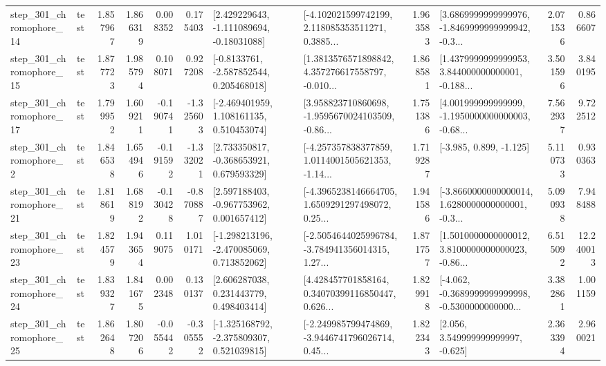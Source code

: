 \begin{tabular}{llrrrrllrlrr}
  step\_301\_chromophore\_14 &      test &      1.857967 &    1.866319 &      0.008352 &  0.175403 &    [2.429229643, -1.111089694, -0.18031088] &  [-4.102021599742199, 2.118085353511271, 0.3885... &       1.963583 &  [3.6869999999999976, -1.8469999999999942, -0.3... &            2.071536 &          0.866607 \\
  step\_301\_chromophore\_15 &      test &      1.877723 &    1.985794 &      0.108071 &  0.927208 &     [-0.8133761, -2.587852544, 0.205468018] &  [1.3813576571898842, 4.357276617558797, -0.010... &       1.868581 &  [1.4379999999999953, 3.844000000000001, -0.188... &            3.501596 &          3.840195 \\
  step\_301\_chromophore\_17 &      test &      1.799952 &    1.609211 &     -0.190741 & -1.325603 &    [-2.469401959, 1.108161135, 0.510453074] &  [3.958823710860698, -1.9595670024103509, -0.86... &       1.751386 &  [4.001999999999999, -1.1950000000000003, -0.68... &            7.562937 &          9.722512 \\
   step\_301\_chromophore\_2 &      test &      1.846538 &    1.654946 &     -0.191592 & -1.332021 &    [2.733350817, -0.368653921, 0.679593329] &  [-4.257357838377859, 1.0114001505621353, -1.14... &       1.719287 &                            [-3.985, 0.899, -1.125] &            5.110733 &          0.930363 \\
  step\_301\_chromophore\_21 &      test &      1.818619 &    1.688192 &     -0.130428 & -0.870887 &    [2.597188403, -0.967753962, 0.001657412] &  [-4.3965238146664705, 1.6509291297498072, 0.25... &       1.941586 &  [-3.8660000000000014, 1.6280000000000001, -0.3... &            5.090938 &          7.948488 \\
  step\_301\_chromophore\_23 &      test &      1.824579 &    1.943654 &      0.119075 &  1.010171 &   [-1.298213196, -2.470085069, 0.713852062] &  [-2.5054644025996784, -3.784941356014315, 1.27... &       1.871757 &  [1.5010000000000012, 3.8100000000000023, -0.86... &            6.515092 &         12.240013 \\
  step\_301\_chromophore\_24 &      test &      1.839327 &    1.841675 &      0.002348 &  0.130137 &     [2.606287038, 0.231443779, 0.498403414] &  [4.428457701858164, 0.34070399116850447, 0.626... &       1.829918 &  [-4.062, -0.3689999999999998, -0.5300000000000... &            3.382861 &          1.001159 \\
  step\_301\_chromophore\_25 &      test &      1.862648 &    1.807206 &     -0.055442 & -0.305552 &   [-1.325168792, -2.375809307, 0.521039815] &  [-2.249985799474869, -3.9446741796026714, 0.45... &       1.822343 &                 [2.056, 3.549999999999997, -0.625] &            2.363394 &          2.960021 \\

\end{tabular}
